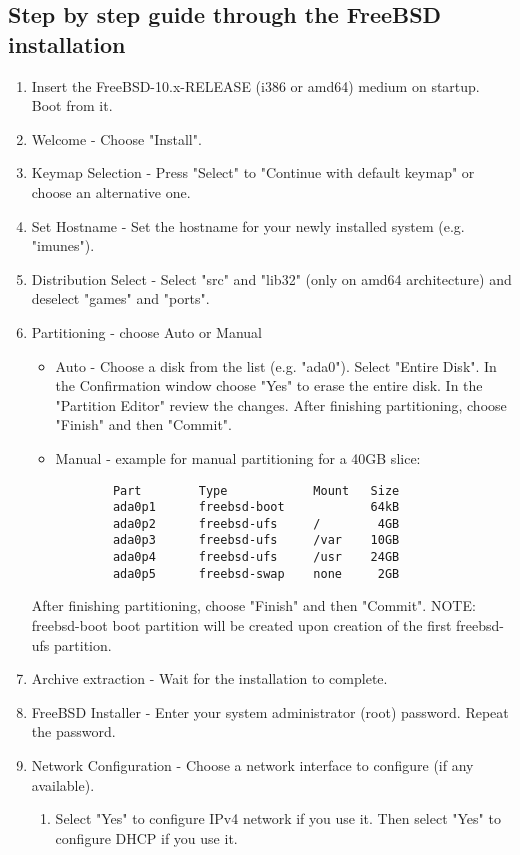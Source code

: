 \subsection{Step by step guide through the FreeBSD installation}
\begin{enumerate}
\item Insert the FreeBSD-10.x-RELEASE (i386 or amd64) medium on startup. Boot from it.
\item Welcome - Choose "Install".
\item Keymap Selection - Press "Select" to "Continue with default keymap" or choose an alternative one.
\item Set Hostname - Set the hostname for your newly installed system (e.g. "imunes").
\item Distribution Select - Select "src" and "lib32" (only on amd64 architecture) and deselect "games" and "ports".
\item Partitioning - choose Auto or Manual
	\begin{itemize}
	\item Auto - Choose a disk from the list (e.g. "ada0"). Select "Entire Disk". In the Confirmation window choose "Yes" to erase the entire disk. In the "Partition Editor" review the changes. After finishing partitioning, choose "Finish" and then "Commit".
	\item Manual - example for manual partitioning for a 40GB slice:
	    \begin{verbatim}
	    Part        Type            Mount   Size
	    ada0p1      freebsd-boot            64kB
	    ada0p2      freebsd-ufs     /        4GB
	    ada0p3      freebsd-ufs     /var    10GB
	    ada0p4      freebsd-ufs     /usr    24GB
	    ada0p5      freebsd-swap    none     2GB
	    \end{verbatim}
	\end{itemize}
	After finishing partitioning, choose "Finish" and then "Commit".
NOTE: freebsd-boot boot partition will be created upon creation of the first freebsd-ufs partition.
\item Archive extraction - Wait for the installation to complete.
\item FreeBSD Installer - Enter your system administrator (root) password. Repeat the password.
\item Network Configuration - Choose a network interface to configure (if any available).
	\begin{enumerate}
	\item Select "Yes" to configure IPv4 network if you use it. Then select "Yes" to configure DHCP if you use it.

\end{enumerate}
\end{enumerate}
